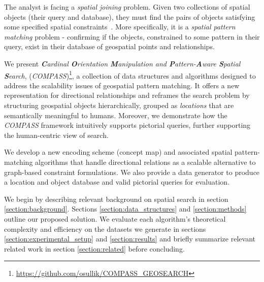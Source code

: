 \par{
     The analyst is facing a \textit{spatial joining} problem. Given two collections of spatial objects (their query and database), they must find the pairs of objects satisfying some specified spatial constraints~\cite{Jacox2007}. 
    More specifically, it is a \textit{spatial pattern matching} problem - confirming if the objects, constrained to some pattern in their query, exist in their database of geospatial points and relationships.
}
\par{
    We present \textit{\textbf{C}ardinal \textbf{O}rientation \textbf{M}anipulation and \textbf{P}attern-\textbf{A}ware \textbf{S}patial \textbf{S}earch}, (\emph{COMPASS})\footnote{\url{https://github.com/osullik/COMPASS_GEOSEARCH}}, a collection of data structures and algorithms designed to address the scalability issues of geospatial pattern matching. It offers a new representation for directional relationships and reframes the search problem by structuring geospatial objects hierarchically, grouped as \textit{locations} that are semantically meaningful to humans.
    Moreover, we demonstrate how the \emph{COMPASS} framework intuitively supports pictorial queries, further supporting the human-centric view of search.   

    We develop a new encoding scheme (concept map) and associated spatial pattern-matching algorithms that handle directional relations as a scalable alternative to graph-based constraint formulations.
    We also provide a data generator to produce a location and object database and valid pictorial queries for evaluation.
 
    We begin by describing relevant background on spatial search in section \ref{section:background}. Sections \ref{section:data_structures} and \ref{section:methods} outline our proposed solution. We evaluate each algorithm's theoretical complexity and efficiency on the datasets we generate in sections \ref{section:experimental_setup} and \ref{section:results} and briefly summarize relevant related work in section \ref{section:related} before concluding.
}


